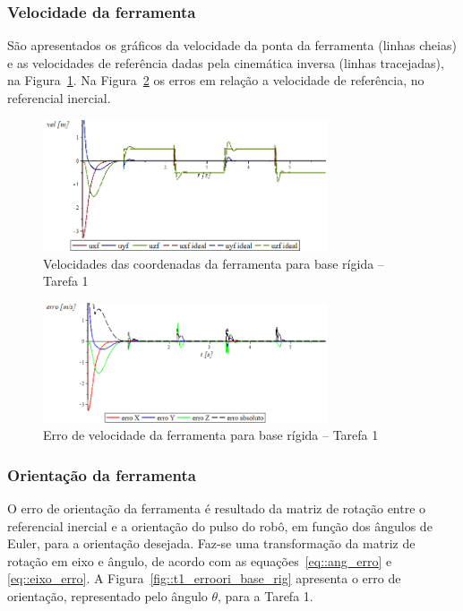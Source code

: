 \subsubsection{Velocidade da ferramenta}

São apresentados os gráficos da velocidade da ponta da ferramenta (linhas
cheias) e as velocidades de referência dadas pela cinemática inversa (linhas
tracejadas), na Figura~\ref{fig::t1_velf_base_rig}. Na
Figura~\ref{fig::t1_errovelf_base_rig} os erros em relação a velocidade de
referência, no referencial inercial.

\begin{figure}[h!]
	\centering 
 	\includegraphics[width=0.75\textwidth]{figs/t1_velf_base_rig}
 	\caption{Velocidades das coordenadas da ferramenta para base rígida -- Tarefa 1}
 	\label{fig::t1_velf_base_rig}
\end{figure}

\begin{figure}[h!]
	\centering 
 	\includegraphics[width=0.75\textwidth]{figs/t1_errovelf_base_rig}
 	\caption{Erro de velocidade da ferramenta para base rígida --
 	Tarefa 1}
 	\label{fig::t1_errovelf_base_rig}
\end{figure}


\subsubsection{Orientação da ferramenta}

O erro de orientação da ferramenta é resultado da matriz de rotação entre o
referencial inercial e a orientação do pulso do robô, em função dos ângulos de
Euler, para a orientação desejada. Faz-se uma transformação da matriz de rotação
em eixo e ângulo, de acordo com as equações~\ref{eq::ang_erro} e
\ref{eq::eixo_erro}. A Figura~\ref{fig::t1_erroori_base_rig} apresenta o
erro de orientação, representado pelo ângulo $\theta$, para a Tarefa 1.

